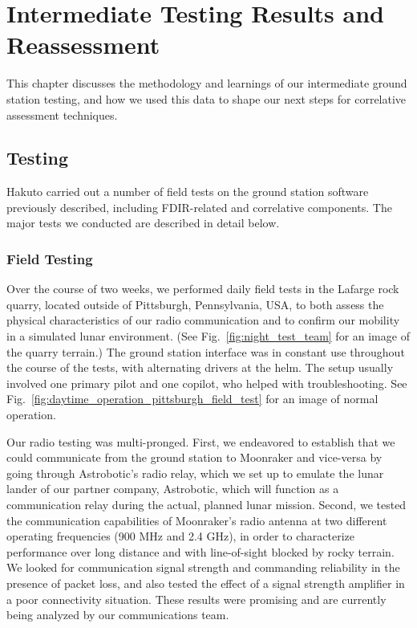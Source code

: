 \chapter{Intermediate Testing Results and Reassessment}

This chapter discusses the methodology and learnings of our intermediate ground station testing, and how we used this data to shape our next steps for correlative assessment techniques.

\section{Testing}

Hakuto carried out a number of field tests on the ground station software previously described, including FDIR-related and correlative components. The major tests we conducted are described in detail below.

\subsection{Field Testing}

Over the course of two weeks, we performed daily field tests in the Lafarge rock quarry, located outside of Pittsburgh, Pennsylvania, USA, to both assess the physical characteristics of our radio communication and to confirm our mobility in a simulated lunar environment. (See Fig.~\ref{fig:night_test_team} for an image of the quarry terrain.) The ground station interface was in constant use throughout the course of the tests, with alternating drivers at the helm. The setup usually involved one primary pilot and one copilot, who helped with troubleshooting. See Fig.~\ref{fig:daytime_operation_pittsburgh_field_test} for an image of normal operation.

Our radio testing was multi-pronged. First, we endeavored to establish that we could communicate from the ground station to Moonraker and vice-versa by going through Astrobotic's radio relay, which we set up to emulate the lunar lander of our partner company, Astrobotic, which will function as a communication relay during the actual, planned lunar mission. Second, we tested the communication capabilities of Moonraker's radio antenna at two different operating frequencies (900 MHz and 2.4 GHz), in order to characterize performance over long distance and with line-of-sight blocked by rocky terrain. We looked for communication signal strength and commanding reliability in the presence of packet loss, and also tested the effect of a signal strength amplifier in a poor connectivity situation. These results were promising and are currently being analyzed by our communications team.


